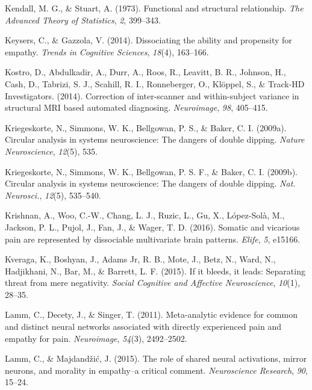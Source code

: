 \documentclass[12pt,american,a4paper,oneside,]{memoir} %
\begin{document}
\leavevmode\hypertarget{ref-kendall1973functional}{}%
Kendall, M. G., \& Stuart, A. (1973). Functional and structural relationship. \emph{The Advanced Theory of Statistics}, \emph{2}, 399--343.

\leavevmode\hypertarget{ref-keysers2014dissociating}{}%
Keysers, C., \& Gazzola, V. (2014). Dissociating the ability and propensity for empathy. \emph{Trends in Cognitive Sciences}, \emph{18}(4), 163--166.

\leavevmode\hypertarget{ref-Kostro2014-cm}{}%
Kostro, D., Abdulkadir, A., Durr, A., Roos, R., Leavitt, B. R., Johnson, H., Cash, D., Tabrizi, S. J., Scahill, R. I., Ronneberger, O., Klöppel, S., \& Track-HD Investigators. (2014). Correction of inter-scanner and within-subject variance in structural MRI based automated diagnosing. \emph{Neuroimage}, \emph{98}, 405--415.

\leavevmode\hypertarget{ref-kriegeskorte2009circular}{}%
Kriegeskorte, N., Simmons, W. K., Bellgowan, P. S., \& Baker, C. I. (2009a). Circular analysis in systems neuroscience: The dangers of double dipping. \emph{Nature Neuroscience}, \emph{12}(5), 535.

\leavevmode\hypertarget{ref-Kriegeskorte2009-yz}{}%
Kriegeskorte, N., Simmons, W. K., Bellgowan, P. S. F., \& Baker, C. I. (2009b). Circular analysis in systems neuroscience: The dangers of double dipping. \emph{Nat. Neurosci.}, \emph{12}(5), 535--540.

\leavevmode\hypertarget{ref-krishnan2016somatic}{}%
Krishnan, A., Woo, C.-W., Chang, L. J., Ruzic, L., Gu, X., López-Solà, M., Jackson, P. L., Pujol, J., Fan, J., \& Wager, T. D. (2016). Somatic and vicarious pain are represented by dissociable multivariate brain patterns. \emph{Elife}, \emph{5}, e15166.

\leavevmode\hypertarget{ref-kveraga2015if}{}%
Kveraga, K., Boshyan, J., Adams Jr, R. B., Mote, J., Betz, N., Ward, N., Hadjikhani, N., Bar, M., \& Barrett, L. F. (2015). If it bleeds, it leads: Separating threat from mere negativity. \emph{Social Cognitive and Affective Neuroscience}, \emph{10}(1), 28--35.

\leavevmode\hypertarget{ref-lamm2011meta}{}%
Lamm, C., Decety, J., \& Singer, T. (2011). Meta-analytic evidence for common and distinct neural networks associated with directly experienced pain and empathy for pain. \emph{Neuroimage}, \emph{54}(3), 2492--2502.

\leavevmode\hypertarget{ref-lamm2015role}{}%
Lamm, C., \& Majdandžić, J. (2015). The role of shared neural activations, mirror neurons, and morality in empathy--a critical comment. \emph{Neuroscience Research}, \emph{90}, 15--24.
\end{document}
